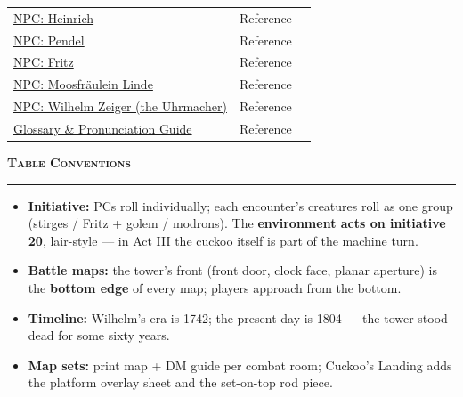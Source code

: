 \documentclass[10pt,letterpaper]{article}
\begin{document}
\begin{tabularx}{\textwidth}{@{}lXr@{}}
\hyperref[sec:npc-heinrich]{NPC: Heinrich} & Reference & \pageref{sec:npc-heinrich} \\
\hyperref[sec:npc-pendel]{NPC: Pendel} & Reference & \pageref{sec:npc-pendel} \\
\hyperref[sec:npc-fritz]{NPC: Fritz} & Reference & \pageref{sec:npc-fritz} \\
\hyperref[sec:npc-linde]{NPC: Moosfräulein Linde} & Reference & \pageref{sec:npc-linde} \\
\hyperref[sec:npc-zeiger]{NPC: Wilhelm Zeiger (the Uhrmacher)} & Reference & \pageref{sec:npc-zeiger} \\
\midrule
\hyperref[sec:glossary]{Glossary \& Pronunciation Guide} & Reference & \pageref{sec:glossary} \\
\bottomrule
\end{tabularx}
\renewcommand{\arraystretch}{1.0}

\vspace{10pt}
{\large\bfseries\scshape Table Conventions}\\[-2pt]
\textcolor{rulecol}{\rule{\textwidth}{0.6pt}}
\begin{itemize}
\item \textbf{Initiative:} PCs roll individually; each encounter's creatures roll as one group (stirges / Fritz + golem / modrons). The \textbf{environment acts on initiative 20}, lair-style --- in Act III the cuckoo itself is part of the machine turn.
\item \textbf{Battle maps:} the tower's front (front door, clock face, planar aperture) is the \textbf{bottom edge} of every map; players approach from the bottom.
\item \textbf{Timeline:} Wilhelm's era is 1742; the present day is 1804 --- the tower stood dead for some sixty years.
\item \textbf{Map sets:} print map + DM guide per combat room; Cuckoo's Landing adds the platform overlay sheet and the set-on-top rod piece.
\end{itemize}
\end{document}
